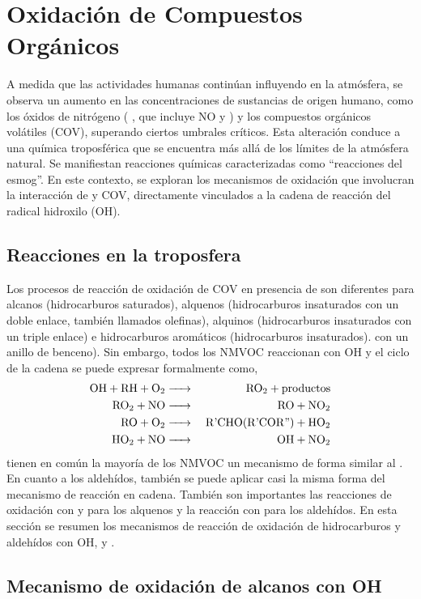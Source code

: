 {\section{Oxidaci\'on de Compuestos Org\'anicos}
A medida que las actividades humanas continúan influyendo en la atmósfera, se observa un aumento en las concentraciones de sustancias de origen humano, como los óxidos de nitrógeno ( , que incluye NO y  ) y los compuestos orgánicos volátiles (COV), superando ciertos umbrales críticos. Esta alteración conduce a una química troposférica que se encuentra más allá de los límites de la atmósfera natural. Se manifiestan reacciones químicas caracterizadas como ``reacciones del esmog''. En este contexto, se exploran los mecanismos de oxidación que involucran la interacción de   y COV, directamente vinculados a la cadena de reacción del radical hidroxilo (OH).

\subsection{Reacciones en la troposfera}
Los procesos de reacción de oxidación de COV en presencia de   son diferentes para alcanos (hidrocarburos saturados), alquenos (hidrocarburos insaturados con un doble enlace, también llamados olefinas), alquinos (hidrocarburos insaturados con un triple enlace) e hidrocarburos aromáticos (hidrocarburos insaturados). con un anillo de benceno). Sin embargo, todos los NMVOC reaccionan con OH y el ciclo de la cadena   se puede expresar formalmente como,
\begin{eqnarray*}
\ce{OH + RH + O2& -> & RO2 + productos \\
RO2 + NO & -> & RO + NO2\\
RO + O2 & -> & R\textrm{'}CHO(R\textrm{'}COR\textrm{''}) + HO2 \\
HO2 + NO & -> & OH + NO2}
\end{eqnarray*}
tienen en común la mayoría de los NMVOC un mecanismo de forma similar al . En cuanto a los aldehídos, también se puede aplicar casi la misma forma del mecanismo de reacción en cadena. También son importantes las reacciones de oxidación con  y  para los alquenos y la reacción con   para los aldehídos. En esta sección se resumen los mecanismos de reacción de oxidación de hidrocarburos y aldehídos con OH,  y .

\subsection{Mecanismo de oxidaci\'on de alcanos con OH}

}
